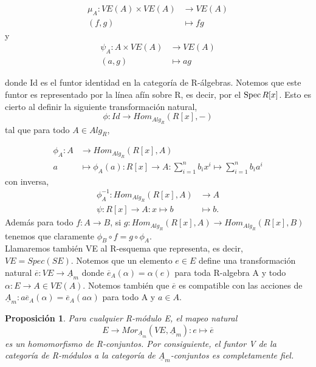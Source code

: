 \documentclass[12pt,spanish]{amsart}
\def\Spec{\mathop{\mbox{\normalfont Spec}}\nolimits}
\newtheorem{prop}[Theorem]{Proposición}
\theoremstyle{definition}
\theoremstyle{remark}
\begin{document}
\begin{equation*}
\begin{split}
\mu_{A}:VE(A)\times VE(A) &\to VE(A) \\
(f,g) &\mapsto fg
\end{split}
\end{equation*}
y
\begin{equation*}
\begin{split}
\psi_{A}:A\times VE(A) &\to VE(A) \\
(a,g) &\mapsto ag
\end{split}
\end{equation*}

donde Id es el funtor identidad en la categoría de R-álgebras. Notemos que este funtor es representado por la línea afín sobre R, es decir, por el $\Spec{R[x]}$. Esto es cierto al definir la siguiente transformación natural,
$$\phi:Id \to Hom_{Alg_{R}}(R[x],-)$$
tal que para todo $A\in Alg_{R}$,

\begin{equation*}
\begin{split}
\phi_{A}:A &\to Hom_{Alg_{R}}(R[x],A) \\
a &\mapsto \phi_{A}(a):R[x] \to A: \sum_{i=1}^{n}b_{i}x^{i} \mapsto \sum_{i=1}^{n}b_{i}a^{i}
\end{split}
\end{equation*}
con inversa,
\begin{equation*}
\begin{split}
\phi_{A}^{-1}: Hom_{Alg_{R}}(R[x],A) &\to A \\
\psi:R[x] \to A:x \mapsto b &\mapsto b.
\end{split}
\end{equation*}
Además para todo $f:A \to B$, si $g:Hom_{Alg_{R}}(R[x],A) \to Hom_{Alg_{R}}(R[x],B)$ tenemos que claramente $\phi_{B} \circ f= g \circ \phi_{A}.$ \\
Llamaremos también VE al R-esquema que representa, es decir, $VE=Spec(SE)$. Notemos que un elemento $e\in E$ define una transformación natural $\overline{e}:VE \to \underline{A}_{m}$ donde $\overline{e}_{A}(\alpha)=\alpha(e)$ para toda R-algebra A y todo $\alpha:E \to A\in VE(A)$. Notemos también que $\overline{e}$ es compatible con las acciones de $\underline{A}_{m}:a\overline{e}_{A}(\alpha)=\overline{e}_{A}(a\alpha)$ para todo A y $a\in A$.   

\begin{prop}
Para cualquier R-módulo E, el mapeo natural
$$E \to Mor_{\underline{A}_{m}}(VE,\underline{A}_{m}):e \mapsto \overline{e}$$
es un homomorfismo de R-conjuntos. Por consiguiente, el funtor V de la categoría de R-módulos a la categoría de $\underline{A}_{m}$-conjuntos es completamente fiel. 
\end{prop}
\end{document}
